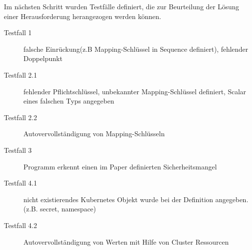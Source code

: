 Im nächsten Schritt wurden Testfälle definiert, die zur Beurteilung der Lösung einer Herausforderung herangezogen werden können.
\begin{description}
    \item[Testfall 1] falsche Einrückung(z.B Mapping-Schlüssel in Sequence definiert), fehlender Doppelpunkt
    \item[Testfall 2.1] fehlender Pflichtschlüssel, unbekannter Mapping-Schlüssel definiert, Scalar eines falschen Typs angegeben
    \item[Testfall 2.2] Autovervollständigung von Mapping-Schlüsseln
    \item[Testfall 3] Programm erkennt einen im Paper definierten Sicherheitsmangel
    \item[Testfall 4.1] nicht existierendes Kubernetes Objekt wurde bei der Definition angegeben. (z.B. secret, namespace)
    \item[Testfall 4.2] Autovervollständigung von Werten mit Hilfe von Cluster Ressourcen
\end{description}




